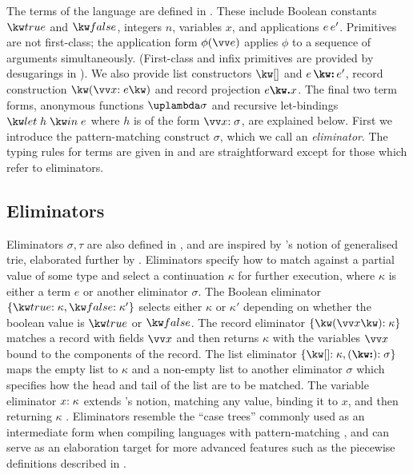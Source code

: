 

The terms of the language are defined in . These include Boolean constants $\exTrue$ and $\exFalse$, integers $n$, variables $x$, and applications ${e}\,{e'}$. Primitives are not first-class; the application form $\exAppPrim{\phi}{\vec{e}}$ applies $\phi$ to a sequence of arguments simultaneously. (First-class and infix primitives are provided by desugarings in ). We also provide list constructors $\exNil$ and $\exCons{e}{e'}$, record construction $\exRec{\vec{\bind{x}{e}}}$ and record projection $\exRecProj{e}{x}$. The final two term forms, anonymous functions $\exLambda{\sigma}$ and recursive let-bindings $\exLetRecMutual{h}{e}$ where $h$ is of the form $\vec{\bind{x}{\sigma}}$, are explained below. First we introduce the pattern-matching construct $\sigma$, which we call an \emph{eliminator}. The typing rules for terms are given in  and are straightforward except for those which refer to eliminators.

\subsection{Eliminators}
\label{sec:core-language:syntax-eliminator}
Eliminators $\sigma, \tau$ are also defined in , and are inspired by \citeauthor{connelly95}'s notion of generalised trie, elaborated further by \citet{hinze00}. Eliminators specify how to match against a partial value of some type and select a continuation $\kappa$ for further execution, where $\kappa$ is either a term $e$ or another eliminator $\sigma$. The Boolean eliminator $\elimBool{\kappa}{\kappa'}$ selects either $\kappa$ or $\kappa'$ depending on whether the boolean value is $\exTrue$ or $\exFalse$. The record eliminator $\elimRec{\seq{x}}{\kappa}$ matches a record with fields $\seq{x}$ and then returns $\kappa$ with the variables $\seq{x}$ bound to the components of the record. The list eliminator $\elimList{\kappa}{\sigma}$ maps the empty list to $\kappa$ and a non-empty list to another eliminator $\sigma$ which specifies how the head and tail of the list are to be matched. The variable eliminator ${x}{:}\;{\kappa}$ extends \citeauthor{connelly95}'s notion, matching any value, binding it to $x$, and then returning $\kappa$ . Eliminators resemble the ``case trees'' commonly used as an intermediate form when compiling languages with pattern-matching \cite{graf20}, and can serve as an elaboration target for more advanced features such as the piecewise definitions described in .

